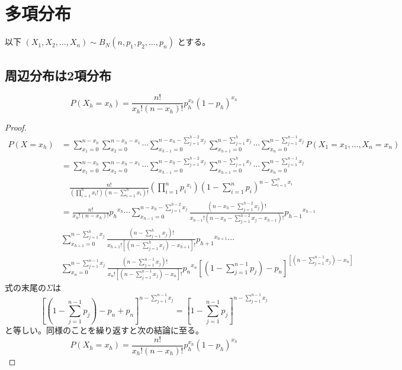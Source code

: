 \chapter{多項分布}
    以下 $(X_1,X_2,\dots,X_n) \sim B_N(n,p_1,p_2,\dots,p_n)$ とする。
    \section{周辺分布は2項分布}
        \begin{shadebox}
            \[P(X_h = x_h) = \frac{n!}{x_h!(n-x_h)!}p_h^{x_h}(1-p_h)^{x_h}\]
        \end{shadebox}
        \begin{proof}
            \begin{align*}
                P(X=x_h) &= \sum_{x_1=0}^{n-x_h}\sum_{x_2=0}^{n-x_h-x_1}\cdots\sum_{x_{h-1}=0}^{n-x_h-\sum_{j=1}^{h-2}{x_j}}\sum_{x_{h+1}=0}^{n-\sum_{j=1}^{h}{x_j}}\cdots\sum_{x_n=0}^{n-\sum_{j=1}^{n-1}{x_j}}{P(X_1=x_1,\dots,X_n=x_n)}\\
                &= \sum_{x_1=0}^{n-x_h}\sum_{x_2=0}^{n-x_h-x_1}\cdots\sum_{x_{h-1}=0}^{n-x_h-\sum_{j=1}^{h-2}{x_j}}\sum_{x_{h+1}=0}^{n-\sum_{j=1}^{h}{x_j}}\cdots\sum_{x_n=0}^{n-\sum_{j=1}^{n-1}{x_j}} \\
                &\quad \frac{n!}{\left(\prod_{i=1}^{n}{x_i!}\right)\left(n-\sum_{i=1}^{n}{x_i}\right)!}\left(\prod_{i=1}^{n}{{p_i}^{x_i}}\right)\left(1-\sum_{i=1}^{n}{p_i}\right)^{n-\sum_{i=1}^{n}{x_i}}\\
                &= \frac{n!}{x_h!(n-x_h)!}{p_h}^{x_h}\cdots\sum_{x_{h-1}=0}^{n-x_h-\sum_{j=1}^{h-2}{x_j}}{\frac{\left(n-x_h-\sum_{j=1}^{h-2}{x_j}\right)!}{x_{h-1}!\left(n-x_h-\sum_{j=1}^{h-2}{x_j}-x_{h-1}\right)!}{p_{h-1}}^{x_{h-1}}}\\
                &{} \sum_{x_{h+1}=0}^{n-\sum_{j=1}^{h}{x_j}}{\frac{\left(n-\sum_{j=1}^{h}{x_j}\right)!}{x_{h+1}!\left[\left(n-\sum_{j=1}^{h}{x_j}\right)-x_{h+1}\right]!}{p_{h+1}}^{x_{h+1}}}\cdots\\
                &{} \sum_{x_n=0}^{n-\sum_{j=1}^{n-1}{x_j}}{\frac{\left(n-\sum_{j=1}^{n-1}{x_j}\right)!}{x_n!\left[\left(n-\sum_{j=1}^{n-1}{x_j}\right)-x_n\right]!}{p_n}^{x_n}}\left[\left(1-\sum_{j=1}^{n-1}{p_j}\right)-p_n\right]^{\left[\left(n-\sum_{j=1}^{n-1}{x_j}\right)-x_n\right]}
            \end{align*}
            式の末尾の$\Sigma$は
            \[\left[\left(1-\sum_{j=1}^{n-1}{p_j}\right) - p_n + p_n\right]^{n-\sum_{j=1}^{n-1}{x_j}} = \left[1-\sum_{j=1}^{n-1}{p_j}\right]^{n-\sum_{j=1}^{n-1}{x_j}}\]
            と等しい。同様のことを繰り返すと次の結論に至る。
            \[P(X_h = x_h) = \frac{n!}{x_h!(n-x_h)!}p_h^{x_h}(1-p_h)^{x_h}\]
        \end{proof}
